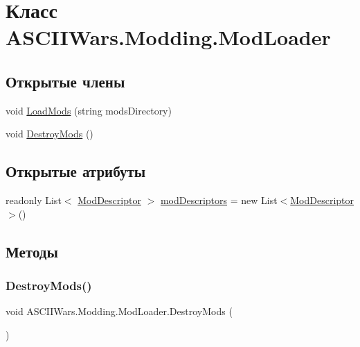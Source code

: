 \hypertarget{class_a_s_c_i_i_wars_1_1_modding_1_1_mod_loader}{}\section{Класс A\+S\+C\+I\+I\+Wars.\+Modding.\+Mod\+Loader}
\label{class_a_s_c_i_i_wars_1_1_modding_1_1_mod_loader}
\subsection*{Открытые члены}
\begin{DoxyCompactItemize}
\item 
void \hyperlink{class_a_s_c_i_i_wars_1_1_modding_1_1_mod_loader_ae224a526624ed5311deddd3ec4a0b23f}{Load\+Mods} (string mods\+Directory)
\item 
void \hyperlink{class_a_s_c_i_i_wars_1_1_modding_1_1_mod_loader_a6d1f4c8e0de091d32e1f8106e0f3e39a}{Destroy\+Mods} ()
\end{DoxyCompactItemize}
\subsection*{Открытые атрибуты}
\begin{DoxyCompactItemize}
\item 
readonly List$<$ \hyperlink{class_a_s_c_i_i_wars_1_1_modding_1_1_mod_descriptor}{Mod\+Descriptor} $>$ \hyperlink{class_a_s_c_i_i_wars_1_1_modding_1_1_mod_loader_a82e3e47bba4f2b077f2f2156954ea853}{mod\+Descriptors} = new List$<$\hyperlink{class_a_s_c_i_i_wars_1_1_modding_1_1_mod_descriptor}{Mod\+Descriptor}$>$()
\end{DoxyCompactItemize}


\subsection{Методы}
\hypertarget{class_a_s_c_i_i_wars_1_1_modding_1_1_mod_loader_a6d1f4c8e0de091d32e1f8106e0f3e39a}{}\label{class_a_s_c_i_i_wars_1_1_modding_1_1_mod_loader_a6d1f4c8e0de091d32e1f8106e0f3e39a} 
\subsubsection{\texorpdfstring{Destroy\+Mods()}{DestroyMods()}}
{\footnotesize\ttfamily void A\+S\+C\+I\+I\+Wars.\+Modding.\+Mod\+Loader.\+Destroy\+Mods (\begin{DoxyParamCaption}{ }\end{DoxyParamCaption})\hspace{0.3cm}{\ttfamily [inline]}}

